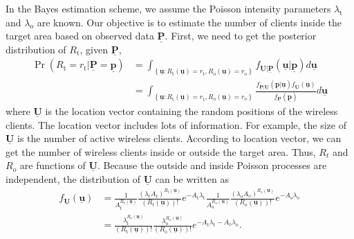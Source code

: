 In the Bayes estimation scheme, we assume the Poisson intensity parameters $\lambda_{\mathrm{t}}$ and $\lambda_{\mathrm{o}}$ are known.
Our objective is to estimate the number of clients inside the target area based on observed data $\underline{\mathbf{P}}$.
First, we need to get the posterior distribution of $R_{\mathrm{t}}$, given $\underline{\mathbf{P}}$,
\begin{equation} \label{equation:PosdistRt}
\begin{split}
\Pr \left( R_{\mathrm{t}} = r_{\mathrm{t}}
| \underline{\mathbf{P}} = \underline{\mathbf{p}} \right)
&= \int_{ \left\{ \underline{\mathbf{u}}
	: R_{\mathrm{t}}(\underline{\mathbf{u}}) = r_{\mathrm{t}},
	R_{\mathrm{o}}(\underline{\mathbf{u}}) = r_{\mathrm{o}}
	\right\} }
f_{\underline{\mathbf{U}} | \underline{\mathbf{P}}}
\left( \underline{\mathbf{u}} | \underline{\mathbf{p}} \right)
d\underline{\mathbf{u}} \\
&= \int_{ \left\{ \underline{\mathbf{u}}
	: R_{\mathrm{t}}(\underline{\mathbf{u}}) = r_{\mathrm{t}},
	R_{\mathrm{o}}(\underline{\mathbf{u}}) = r_{\mathrm{o}} \right\} }
\frac{ f_{\underline{\mathbf{P}} | \underline{\mathbf{U}}}
	\left( \underline{\mathbf{p}} | \underline{\mathbf{u}} \right)
	f_{\underline{\mathbf{U}}} (\underline{\mathbf{u}}) }
{ f_{\underline{\mathbf{P}}} \left( \underline{\mathbf{p}} \right) }
d\underline{\mathbf{u}} 
\end{split}
\end{equation}
where $\underline{\mathbf{U}}$ is the location vector containing the random positions of the wireless clients. The location vector includes lots of information. For example, the size of $\underline{\mathbf{U}}$ is the number of active wireless clients.
According to location vector, we can get the number of wireless clients inside or outside the target area.
Thus, $R_{t}$ and $R_{o}$ are functions of $\underline{\mathbf{U}}$.
Because the outside and inside Poisson processes are independent, the distribution of $\underline{\mathbf{U}}$ can be written as
\begin{equation} \label{equation:distU}
\begin{split}
f_{\underline{\mathbf{U}}} ( \underline{\mathbf{u}} )
&= \frac{1}{A_{\mathrm{t}}^{R_{\mathrm{t}}(\underline{\mathbf{u}})}}
\frac{ ( \lambda_{\mathrm{t}}
	A_{\mathrm{t}} )^{R_{\mathrm{t}}(\underline{\mathbf{u}})} }
{ ( R_{\mathrm{t}}(\underline{\mathbf{u}}) )! }
e^{- A_{\mathrm{t}} \lambda_{\mathrm{t}}}
\frac{1}{A_{\mathrm{o}}^{R_{\mathrm{o}}(\underline{\mathbf{u}})}}
\frac{ ( \lambda_{\mathrm{o}}
	A_{\mathrm{o}} )^{R_{\mathrm{o}}(\underline{\mathbf{u}})} }
{ ( R_{\mathrm{o}}(\underline{\mathbf{u}}) )! }
e^{- A_{\mathrm{o}} \lambda_{\mathrm{o}}} \\
&= \frac{ \lambda_{\mathrm{t}}^{R_{\mathrm{t}}(\underline{\mathbf{u}})} }
{ ( R_{\mathrm{t}}(\underline{\mathbf{u}}) )! }
\frac{ \lambda_{\mathrm{o}}^{R_{\mathrm{o}}(\underline{\mathbf{u}})} }
{ ( R_{\mathrm{o}}(\underline{\mathbf{u}}) )! }
e^{- A_{\mathrm{t}} \lambda_{\mathrm{t}}
	- A_{\mathrm{o}} \lambda_{\mathrm{o}}} .
\end{split}
\end{equation}
